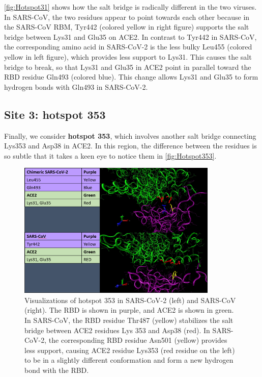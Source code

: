 \autoref{fig:Hotspot31} shows how the salt bridge is radically different in the two viruses. In SARS-CoV, the two residues appear to point towards each other because in the SARS-CoV RBM, Tyr442 (colored yellow in right figure) supports the salt bridge between Lys31 and Glu35 on ACE2. In contrast to Tyr442 in SARS-CoV, the corresponding amino acid in SARS-CoV-2 is the less bulky Leu455 (colored yellow in left figure), which provides less support to Lys31. This causes the salt bridge to break, so that Lys31 and Glu35 in ACE2 point in parallel toward the RBD residue Gln493 (colored blue). This change allows Lys31 and Glu35 to form hydrogen bonds with Gln493 in SARS-CoV-2.

\FloatBarrier
{}
\subsection{Site 3: hotspot 353}

Finally, we consider \textbf{hotspot 353}, which involves another salt bridge connecting Lys353 and Asp38 in ACE2. In this region, the difference between the residues is so subtle that it takes a keen eye to notice them in \autoref{fig:Hotspot353}.

\begin{figure}[h]
	\centering
	\mySfFamily
	\includegraphics[width = 0.85\textwidth]{../images/Hotspot31.png}
	\caption{Visualizations of hotspot 353 in SARS-CoV-2 (left) and SARS-CoV (right). The RBD is shown in purple, and ACE2 is shown in green. In SARS-CoV, the RBD residue Thr487 (yellow) stabilizes the salt bridge between ACE2 residues Lys 353 and Asp38 (red). In SARS-CoV-2, the corresponding RBD residue Asn501 (yellow) provides less support, causing ACE2 residue Lys353 (red residue on the left) to be in a slightly different conformation and form a new hydrogen bond with the RBD.}
	\label{fig:Hotspot353}
\end{figure}

